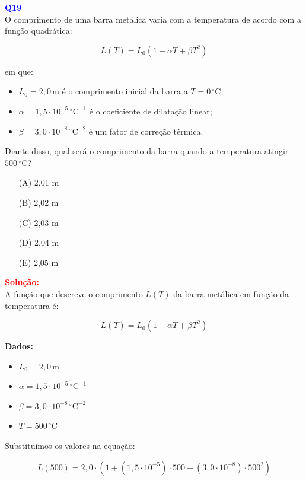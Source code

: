\documentclass[a4paper,12pt]{article}
\begin{document}
\begin{flushleft}
\textbf{\textcolor{blue}{\Large Q19}}\\
O comprimento de uma barra metálica varia com a temperatura de acordo com a função quadrática:

\[
L(T) = L_0 (1 + \alpha T + \beta T^2)
\]

em que:

\begin{itemize}
  \item \(L_0 = 2{,}0\,\text{m}\) é o comprimento inicial da barra a \(T = 0\,^\circ\text{C}\);
  \item \(\alpha = 1{,}5 \cdot 10^{-5}\,^\circ\text{C}^{-1}\) é o coeficiente de dilatação linear;
  \item \(\beta = 3{,}0 \cdot 10^{-8}\,^\circ\text{C}^{-2}\) é um fator de correção térmica.
\end{itemize}

Diante disso, qual será o comprimento da barra quando a temperatura atingir \(500\,^\circ\text{C}\)?


\begin{itemize}
\item[(A)] 2,01 m
\item[(B)] 2,02 m
\item[(C)] 2,03 m
\item[(D)] 2,04 m
\item[(E)] 2,05 m
\end{itemize}

\vspace{0.5cm}

\textcolor{red}{\textbf{Solução:}}\\

A função que descreve o comprimento \(L(T)\) da barra metálica em função da temperatura é:

\[
L(T) = L_0 (1 + \alpha T + \beta T^2)
\]

\textbf{Dados:}
\begin{itemize}
  \item \(L_0 = 2{,}0\,\text{m}\)
  \item \(\alpha = 1{,}5 \cdot 10^{-5}\,^\circ\text{C}^{-1}\)
  \item \(\beta = 3{,}0 \cdot 10^{-8}\,^\circ\text{C}^{-2}\)
  \item \(T = 500\,^\circ\text{C}\)
\end{itemize}

Substituímos os valores na equação:

\[
L(500) = 2{,}0 \cdot \left(1 + (1{,}5 \cdot 10^{-5}) \cdot 500 + (3{,}0 \cdot 10^{-8}) \cdot 500^2 \right)
\]


\end{flushleft}
\end{document}
